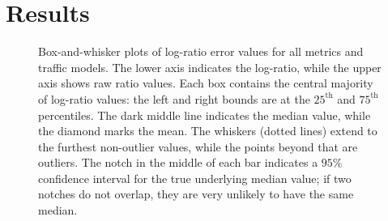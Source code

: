 \documentclass[conference]{IEEEtran}
\begin{document}
\section{Results}\label{sec:results}

\begin{figure}[htb]
%
%
%
\caption{Box-and-whisker plots of log-ratio error values for all metrics and traffic models. The lower axis indicates the log-ratio, while the upper axis shows raw ratio values. Each box contains the central majority of log-ratio values: the left and right bounds are at the $25^\text{th}$ and $75^\text{th}$ percentiles. The dark middle line indicates the median value, while the diamond marks the mean. The whiskers (dotted lines) extend to the furthest non-outlier values, while the points beyond that are outliers. The notch in the middle of each bar indicates a $95\%$ confidence interval for the true underlying median value; if two notches do not overlap, they are very unlikely to have the same median.}
\label{fig:box-plots}
\vspace{-1.25em}
\end{figure}
\end{document}
